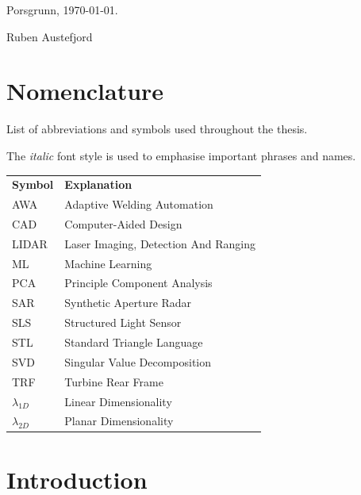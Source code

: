 \documentclass[%
]{USN-MSc}
\newcommand{\myauthor}{%
Ruben Austefjord
}
\begin{document}
\bigskip

Porsgrunn, \today.

\myauthor %
\tableofcontents
{}

\listoffigures  %



\chapter*{Nomenclature}
\label{sec:nomenclature}
List of abbreviations and symbols used throughout the thesis.

The \textit{italic} font style is used to emphasise important phrases and names.


\begin{longtable}{ll}
  \textbf{Symbol}    & \textbf{Explanation}\endhead         \\
    AWA              & Adaptive Welding Automation          \\
    CAD              & Computer-Aided Design                \\
    LIDAR            & Laser Imaging, Detection And Ranging \\
    ML               & Machine Learning                     \\
    PCA              & Principle Component Analysis         \\
    SAR              & Synthetic Aperture Radar             \\
    SLS              & Structured Light Sensor              \\
    STL              & Standard Triangle Language           \\
    SVD              & Singular Value Decomposition         \\
    TRF              & Turbine Rear Frame                   \\
    \(\lambda_{1D}\) & Linear Dimensionality                \\
    \(\lambda_{2D}\) & Planar Dimensionality                \\

\end{longtable}

\chapter{Introduction}
\label{ch:intro}
\end{document}

